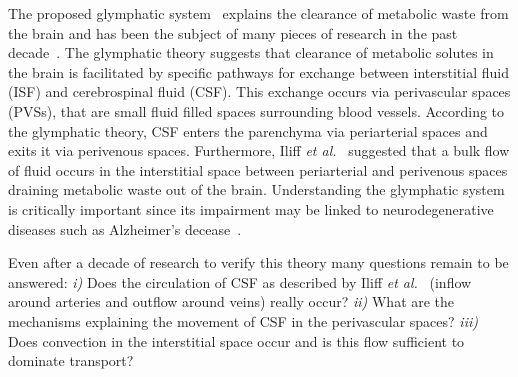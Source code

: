 \documentclass[10pt]{article}
\newcommand{\etal}{\emph{et al.}\;}
\newcommand{\1}{^{(1)}}
\newcommand{\2}{^{(2)}}
\begin{document}
The proposed glymphatic system~\cite{Iliff_2012_PVS} explains the clearance of metabolic waste from the brain and has been the subject of many pieces of research in the past decade~\cite{Holter9894,abbott_role_2018,jessen_glymphatic_2015}. The glymphatic theory suggests that clearance of metabolic solutes in the brain is facilitated by specific pathways for exchange between interstitial fluid (ISF) and cerebrospinal fluid (CSF). This exchange occurs via perivascular spaces (PVSs), that are small fluid filled spaces surrounding blood vessels. According to the glymphatic theory, CSF enters the parenchyma via periarterial spaces and exits it via perivenous spaces. Furthermore, Iliff \etal~\cite{Iliff_2012_PVS} suggested that a bulk flow of fluid occurs in the interstitial space between periarterial and perivenous spaces draining metabolic waste out of the brain. Understanding the glymphatic system is critically important since its impairment may be linked to neurodegenerative diseases such as Alzheimer's decease~\cite{reeves_glymphatic_2020}.

Even after a decade of research to verify this theory many questions remain to be answered:
\textit{i)} Does the circulation of CSF as described by Iliff \etal~\cite{Iliff_2012_PVS} (inflow around arteries and outflow around veins) really occur? 
\textit{ii)} What are the mechanisms explaining the movement of CSF in the perivascular spaces?
\textit{iii)} Does convection in the interstitial space occur and is this flow sufficient to dominate transport? 

\end{document}
